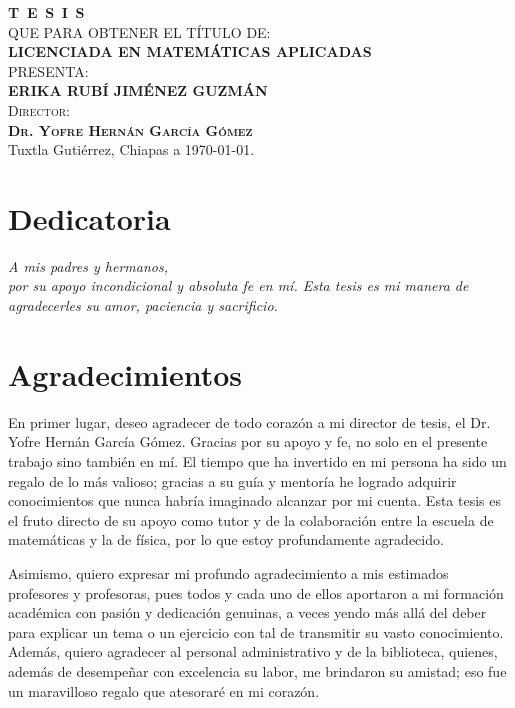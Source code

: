 \begin{titlepage}
\begin{minipage}[t][0.95\textheight][c]{0.76\textwidth}
\begin{center}
                \textsc{\huge \textbf{T\, E\, S\, I\, S}}\\[1.5cm]
                \textsc{\large QUE PARA OBTENER EL TÍTULO DE:}\\[0.3cm]
                \textbf{\textsc{LICENCIADA EN MATEMÁTICAS APLICADAS}}\\[1.5cm]
                \textsc{\large PRESENTA:}\\[0.3cm]
                \textbf{\textsc{\large {ERIKA RUBÍ JIMÉNEZ GUZMÁN}}}\\[2cm]
                {\large\scshape Director:\\[0.3cm]
                {\textbf{\large Dr. Yofre Hernán García Gómez }}}\\[2.0cm]
                \large{Tuxtla Gutiérrez, Chiapas a \today.}

            \end{center}
\end{minipage}
\end{titlepage}

\pagebreak[2]

\chapter*{Dedicatoria}
\begin{flushright}
\textit{A mis padres y hermanos, \\ por su apoyo incondicional y absoluta fe en mí. Esta tesis es mi manera de agradecerles su amor, paciencia y sacrificio.}
\end{flushright}

\chapter*{Agradecimientos}
En primer lugar, deseo agradecer de todo corazón a mi director de tesis, el Dr. Yofre Hernán García Gómez. Gracias por su apoyo y fe, no solo en el presente trabajo sino también en mí. El tiempo que ha invertido en mi persona ha sido un regalo de lo más valioso; gracias a su guía y mentoría he logrado adquirir conocimientos que nunca habría imaginado alcanzar por mi cuenta. Esta tesis es el fruto directo de su apoyo como tutor y de la colaboración entre la escuela de matemáticas y la de física, por lo que estoy profundamente agradecido.

Asimismo, quiero expresar mi profundo agradecimiento a mis estimados profesores y profesoras, pues todos y cada uno de ellos aportaron a mi formación académica con pasión y dedicación genuinas, a veces yendo más allá del deber para explicar un tema o un ejercicio con tal de transmitir su vasto conocimiento. Además, quiero agradecer al personal administrativo y de la biblioteca, quienes, además de desempeñar con excelencia su labor, me brindaron su amistad; eso fue un maravilloso regalo que atesoraré en mi corazón.

